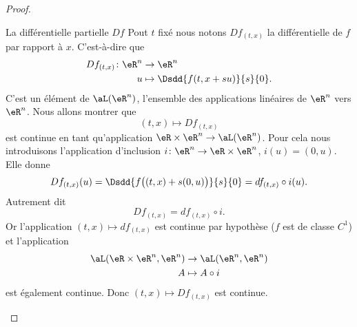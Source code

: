 \begin{proof}
    \begin{subproof}
        \item[La différentielle partielle \( Df\)]
            Pout \( t\) fixé nous notons \( Df_{(t,x)}\) la différentielle de \( f\) par rapport à \( x\). C'est-à-dire que
            \begin{equation}
                \begin{aligned}
                    Df_{(t,x)}\colon \eR^n&\to \eR^n \\
                    u&\mapsto \Dsdd{ f(t,x+su) }{s}{0}.
                \end{aligned}
            \end{equation}
            C'est un élément de \( \aL(\eR^n)\), l'ensemble des applications linéaires de \( \eR^n\) vers \( \eR^n\). Nous allons montrer que
            \begin{equation}
                (t,x)\mapsto Df_{(t,x)}
            \end{equation}
            est continue en tant qu'application \( \eR\times \eR^n\to\aL(\eR^n)\). Pour cela nous introduisons l'application d'inclusion \( i\colon \eR^n\to \eR\times \eR^n\), \( i(u)=(0,u)\). Elle donne
            \begin{equation}
                Df_{(t,x)}(u)=\Dsdd{ f\big( (t,x)+s(0,u) \big) }{s}{0}=df_{(t,x)}\circ i (u).
            \end{equation}
            Autrement dit
            \begin{equation}
                Df_{(t,x)}=df_{(t,x)}\circ i.
            \end{equation}
            Or l'application \( (t,x)\mapsto df_{(t,x)} \) est continue par hypothèse (\( f\) est de classe \( C^1\)) et l'application
            \begin{equation}        \label{EQooZTAPooCduWcl}
                \begin{aligned}
                     \aL(\eR\times \eR^n,\eR^n)&\to \aL(\eR^n,\eR^n) \\
                    A&\mapsto A\circ i
                \end{aligned}
            \end{equation}
            est également continue. Donc \( (t,x)\mapsto Df_{(t,x)}\) est continue.


\end{subproof}
\end{proof}
